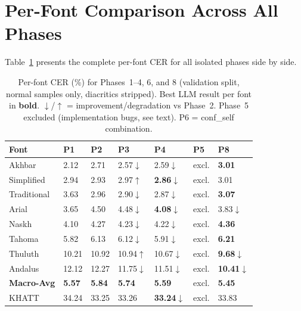 \section{Per-Font Comparison Across All Phases}
\label{sec:res_per_font}

Table~\ref{tab:per_font_all_phases} presents the complete per-font CER for
all isolated phases side by side.

\begin{table}[htbp]
  \centering
  \caption{Per-font CER (\%) for Phases~1--4, 6, and 8 (validation split,
           normal samples only, diacritics stripped). Best LLM result per font
           in \textbf{bold}. $\downarrow$/$\uparrow$ = improvement/degradation
           vs Phase~2. Phase~5 excluded (implementation bugs, see text). P6 =
           conf\_self combination.}
  \label{tab:per_font_all_phases}
  \begin{tabularx}{\textwidth}{lXXXXXX}
    \toprule
    \textbf{Font} & \textbf{P1} & \textbf{P2} & \textbf{P3}
      & \textbf{P4} & \textbf{P5} & \textbf{P8} \\
    \midrule
    Akhbar       &  2.12 &  2.71 &  2.57$\downarrow$ &  2.59$\downarrow$ & excl. & \textbf{3.01} \\
    Simplified   &  2.94 &  2.93 &  2.97$\uparrow$  &  \textbf{2.86}$\downarrow$ & excl. &  3.01 \\
    Traditional  &  3.63 &  2.96 &  2.90$\downarrow$ &  2.87$\downarrow$ & excl. & \textbf{3.07} \\
    Arial        &  3.65 &  4.50 &  4.48$\downarrow$ &  \textbf{4.08}$\downarrow$ & excl. &  3.83$\downarrow$ \\
    Naskh        &  4.10 &  4.27 &  4.23$\downarrow$ &  4.22$\downarrow$ & excl. & \textbf{4.36} \\
    Tahoma       &  5.82 &  6.13 &  6.12$\downarrow$ &  5.91$\downarrow$ & excl. & \textbf{6.21} \\
    Thuluth      & 10.21 & 10.92 & 10.94$\uparrow$  & 10.67$\downarrow$ & excl. & \textbf{9.68}$\downarrow$ \\
    Andalus      & 12.12 & 12.27 & 11.75$\downarrow$ & 11.51$\downarrow$ & excl. & \textbf{10.41}$\downarrow$ \\
    \midrule
    \textbf{Macro-Avg} & \textbf{5.57} & \textbf{5.84} & \textbf{5.74} & \textbf{5.59} & excl. & \textbf{5.45} \\
    \midrule
    KHATT        & 34.24 & 33.25 & 33.26 & \textbf{33.24}$\downarrow$ & excl. & 33.83 \\
    \bottomrule
  \end{tabularx}
\end{table}

